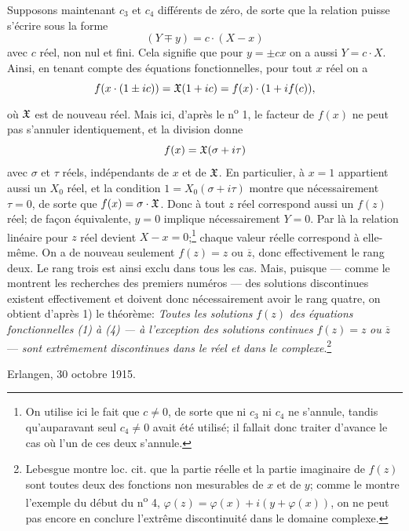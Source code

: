 Supposons maintenant $c_3$ et $c_4$ différents de zéro, de sorte que la relation puisse s'écrire sous la forme
\[
(Y\mp y)=c\cdot(X-x)
\]
avec $c$ réel, non nul et fini. Cela signifie que pour $y=\pm cx$ on a aussi $Y=c\cdot X$. Ainsi, en tenant compte des équations fonctionnelles, pour tout $x$ réel on a
\[
f(x\cdot(1\pm ic))=\mathfrak{X}(1+ic)=f(x)\cdot(1+i f(c)),
\]
où $\mathfrak{X}$ est de nouveau réel. Mais ici, d'après le n\textsuperscript{o} 1, le facteur de $f(x)$ ne peut pas s'annuler identiquement, et la division donne
\[
f(x)=\mathfrak{X}(\sigma+i\tau)
\]
avec $\sigma$ et $\tau$ réels, indépendants de $x$ et de $\mathfrak{X}$. En particulier, à $x=1$ appartient aussi un $X_0$ réel, et la condition $1=X_0(\sigma+i\tau)$ montre que nécessairement $\tau=0$, de sorte que $f(x)=\sigma\cdot\mathfrak{X}$. Donc à tout $z$ réel correspond aussi un $f(z)$ réel; de façon équivalente, $y=0$ implique nécessairement $Y=0$. Par là la relation linéaire pour $z$ réel devient $X-x=0$;\footnote{On utilise ici le fait que $c\ne0$, de sorte que ni $c_3$ ni $c_4$ ne s'annule, tandis qu'auparavant seul $c_4\ne0$ avait été utilisé; il fallait donc traiter d'avance le cas où l'un de ces deux s'annule.} chaque valeur réelle correspond à elle-même. On a de nouveau seulement $f(z)=z$ ou $\overline z$, donc effectivement le rang deux. Le rang trois est ainsi exclu dans tous les cas. Mais, puisque --- comme le montrent les recherches des premiers numéros --- des solutions discontinues existent effectivement et doivent donc nécessairement avoir le rang quatre, on obtient d'après 1) le théorème: \emph{\og{}Toutes les solutions} $f(z)$ \emph{des équations fonctionnelles (1) à (4) --- à l'exception des solutions continues} $f(z)=z$ \emph{ou} $\overline z$ --- \emph{sont extrêmement discontinues dans le réel et dans le complexe}.\fg{}\footnote{Lebesgue montre loc. cit. que la partie réelle et la partie imaginaire de $f(z)$ sont toutes deux des fonctions \og{}non mesurables\fg{} de $x$ et de $y$; comme le montre l'exemple du début du n\textsuperscript{o} 4, $\varphi(z)=\varphi(x)+i(y+\varphi(x))$, on ne peut pas encore en conclure l'extrême discontinuité dans le domaine complexe.}

\medskip
\noindent Erlangen, 30 octobre 1915.
